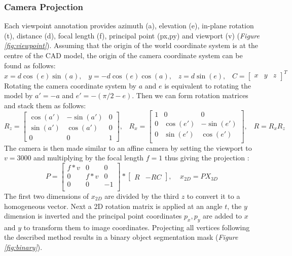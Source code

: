 \documentclass[main.tex]{subfiles}
\begin{document}
\subsubsection{Camera Projection}
Each viewpoint annotation provides azimuth (a), elevation (e), in-plane rotation (t), distance (d), focal length (f), principal point (px,py) and viewport (v) (\emph{Figure \ref{fig:viewpoint}}). Assuming that the origin of the world coordinate system is at the centre of the CAD model, the origin of the camera coordinate system can be found as follows:
\begin{equation}
x = d\cos(e)\sin(a), \;\;\; y = -d\cos(e)\cos(a), \;\;\; z = d\sin(e), \;\;\; C = 
\begin{bmatrix}
x & y & z
\end{bmatrix}^T
\end{equation}
\indent Rotating the camera coordinate system by $a$ and $e$ is equivalent to rotating the model by $a'=-a$ and $e'=-(\pi /2 - e)$. Then we can form rotation matrices and stack them as follows:
\begin{equation}
R_z = 
\begin{bmatrix}
\cos(a') & -\sin(a') & 0 \\
\sin(a') & \cos(a') & 0 \\
0 & 0 & 1
\end{bmatrix},  \; \; \;
R_x =
\begin{bmatrix}
1 & 0 & 0 \\
0 & \cos(e') & -\sin(e') \\
0 & \sin(e') & \cos(e') \\
\end{bmatrix}, \; \; \;
R = R_x R_z
\end{equation}
\indent The camera is then made similar to an affine camera by setting the viewport to $v=3000$ and multiplying by the focal length $f=1$ thus giving the projection  \cite{Xiang2014}:
\begin{equation}
P = 
\begin{bmatrix}
f*v & 0 & 0 \\
0 & f*v & 0 \\
0 & 0 & -1 \\
\end{bmatrix}
*
\begin{bmatrix}
R & -RC
\end{bmatrix}, \;\; \;\; 
x_{2D} = PX_{3D}
\end{equation}
\indent The first two dimensions of $x_{2D}$ are divided by the third $z$ to convert it to a homogeneous vector. Next a 2D rotation matrix is applied at an angle $t$, the $y$ dimension is inverted and the principal point coordinates $p_x, p_y$ are added to $x$ and $y$ to transform them to image coordinates. Projecting all vertices following the described method results in a binary object segmentation mask (\emph{Figure \ref{fig:binary}}). 
\end{document}
